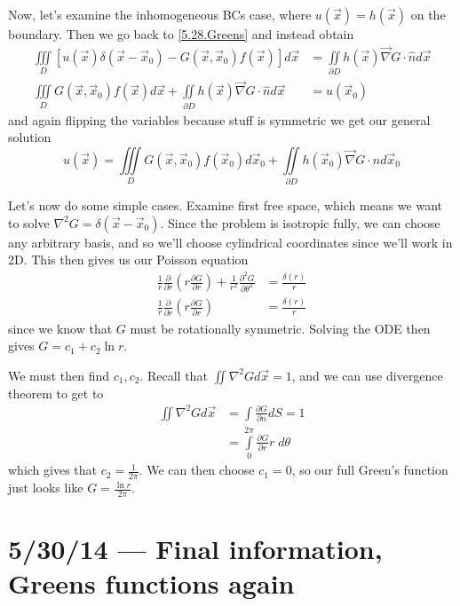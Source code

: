\documentclass[10pt]{report}
\newcommand{\ptd}[2]{\frac{\partial^2 #1}{\partial#2^2}}
\newcommand{\pd}[2]{\frac{\partial #1}{\partial#2}}
\begin{document}
Now, let's examine the inhomogeneous BCs case, where $u(\vec{x}) = h(\vec{x})$ on the boundary. Then we go back to \eqref{5.28.Greens} and instead obtain
\begin{align}
    \iiint\limits_D \left[ u(\vec{x}) \delta(\vec{x} - \vec{x}_0) - G(\vec{x}, \vec{x}_0) f(\vec{x}) \right]d\vec{x} &= \iint\limits_{\partial D}h(\vec{x}) \vec{\nabla}G \cdot \hat{n}d\vec{x}\\
    \iiint\limits_D G(\vec{x}, \vec{x}_0) f(\vec{x})d\vec{x} + \iint\limits_{\partial D}h(\vec{x}) \vec{\nabla}G \cdot \hat{n} d\vec{x} &= u(\vec{x}_0)
\end{align}
and again flipping the variables because stuff is symmetric we get our general solution
\begin{equation}
    u(\vec{x}) = \iiint\limits_D G(\vec{x}, \vec{x}_0) f(\vec{x}_0)d\vec{x}_0 + \iint\limits_{\partial D}h(\vec{x}_0) \vec{\nabla}G \cdot \hat{n} d\vec{x}_0
\end{equation}

Let's now do some simple cases. Examine first free space, which means we want to solve $\nabla^2 G = \delta(\vec{x} - \vec{x}_0)$. Since the problem is isotropic fully, we can choose any arbitrary basis, and so we'll choose cylindrical coordinates since we'll work in 2D. This then gives us our Poisson equation
\begin{align}
    \frac{1}{r}\pd{}{r} \left( r \pd{G}{r} \right) + \frac{1}{r^2}\ptd{G}{\theta} &= \frac{\delta(r)}{r}\\
    \frac{1}{r}\pd{}{r} \left( r \pd{G}{r} \right)  &= \frac{\delta(r)}{r}
\end{align}
since we know that $G$ must be rotationally symmetric. Solving the ODE then gives $G = c_1 + c_2 \ln r$.

We must then find $c_1, c_2$. Recall that $\iint \nabla^2 G d\vec{x}= 1$, and we can use divergence theorem to get to
\begin{align}
    \iint \nabla^2 G d\vec{x} &= \int \pd{G}{n}dS = 1\\
    &= \int\limits_{0}^{2\pi}\pd{G}{r}r\;d\theta
\end{align}
which gives that $c_2 = \frac{1}{2\pi}$. We can then choose $c_1 = 0$, so our full Green's function just looks like $G = \frac{\ln r}{2\pi}$. 

\chapter{5/30/14 --- Final information, Greens functions again}
\end{document}
